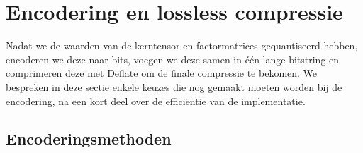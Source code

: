 \section{Encodering en lossless compressie}
\label{sec:encodering}

Nadat we de waarden van de kerntensor en factormatrices gequantiseerd hebben, encoderen we deze naar bits, voegen we deze samen in \'e\'en lange bitstring en comprimeren deze met Deflate om de finale compressie te bekomen. We bespreken in deze sectie enkele keuzes die nog gemaakt moeten worden bij de encodering, na een kort deel over de effici\"entie van de implementatie.

\subsection{Encoderingsmethoden}


